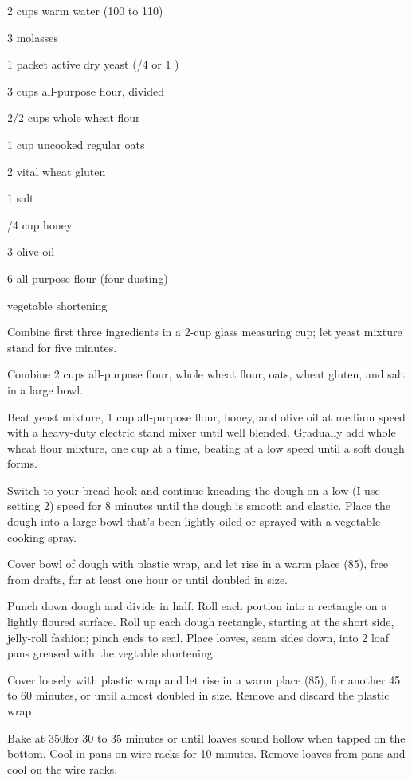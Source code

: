 \begin{IngredientsAndSteps}
    \ListIngredientsAndSteps
    {
        2 cups warm water (100 to 110\Degrees[F])

        3 \Tbl[s] molasses

        1 packet active dry yeast (/4 \Ounce or 1 \Tbl)

        3 cups all-purpose flour, divided

        2/2 cups whole wheat flour

        1 cup uncooked regular oats

        2 \Tbl[s] vital wheat gluten

        1 \Tbl salt

        /4 cup honey

        3 \Tbl[s] olive oil

        6 \Tbl[s] all-purpose flour (four dusting)

        vegetable shortening
    }
    {
        Combine first three ingredients in a 2-cup glass measuring cup; let yeast
        mixture stand for five minutes.

        Combine 2 cups all-purpose flour, whole wheat flour, oats, wheat gluten, and salt in a large bowl.

        Beat yeast mixture, 1 cup all-purpose flour, honey, and olive oil at medium speed with
        a heavy-duty electric stand mixer until well blended. Gradually add whole wheat flour
        mixture, one cup at a time, beating at a low speed until a soft dough forms.

        Switch to your bread hook and continue kneading the dough on a low (I use setting 2)
        speed for 8 minutes until the dough is smooth and elastic. Place the dough into a
        large bowl that's been lightly oiled or sprayed with a vegetable cooking spray.

        Cover bowl of dough with plastic wrap, and let rise in a warm place (85\Degrees[F]), free from
        drafts, for at least one hour or until doubled in size.

        Punch down dough and divide in half. Roll each portion into a  rectangle on a
        lightly floured surface. Roll up each dough rectangle, starting at the short side,
        jelly-roll fashion; pinch ends to seal. Place loaves, seam sides down, into
        2 
        loaf pans greased with the vegtable shortening.

        Cover loosely with plastic wrap and let rise in a warm place (85\Degrees[F]), for another
        45 to 60 minutes, or until almost doubled in size. Remove and discard the plastic wrap.

        Bake at 350\Degrees[F] for 30 to 35 minutes or until loaves sound hollow when tapped on the bottom.
        Cool in pans on wire racks for 10 minutes. Remove loaves from pans and cool on the wire racks.
    }
\end{IngredientsAndSteps}

